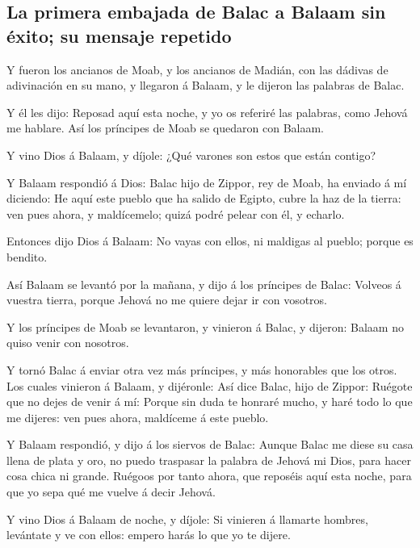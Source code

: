 \hypertarget{la-primera-embajada-de-balac-a-balaam-sin-uxe9xito-su-mensaje-repetido}{%
\subsection{La primera embajada de Balac a Balaam sin éxito; su mensaje
repetido}\label{la-primera-embajada-de-balac-a-balaam-sin-uxe9xito-su-mensaje-repetido}}

 Y fueron los ancianos de Moab, y los ancianos de Madián,
con las dádivas de adivinación en su mano, y llegaron á Balaam, y le
dijeron las palabras de Balac.

 Y él les dijo: Reposad aquí esta noche, y yo os referiré
las palabras, como Jehová me hablare. Así los príncipes de Moab se
quedaron con Balaam.

 Y vino Dios á Balaam, y díjole: ¿Qué varones son estos que
están contigo?

 Y Balaam respondió á Dios: Balac hijo de Zippor, rey de
Moab, ha enviado á mí diciendo:  He aquí este pueblo que ha
salido de Egipto, cubre la haz de la tierra: ven pues ahora, y
maldícemelo; quizá podré pelear con él, y echarlo.

 Entonces dijo Dios á Balaam: No vayas con ellos, ni
maldigas al pueblo; porque es bendito.

 Así Balaam se levantó por la mañana, y dijo á los
príncipes de Balac: Volveos á vuestra tierra, porque Jehová no me quiere
dejar ir con vosotros.

 Y los príncipes de Moab se levantaron, y vinieron á Balac,
y dijeron: Balaam no quiso venir con nosotros.

 Y tornó Balac á enviar otra vez más príncipes, y más
honorables que los otros.  Los cuales vinieron á Balaam, y
dijéronle: Así dice Balac, hijo de Zippor: Ruégote que no dejes de venir
á mí:  Porque sin duda te honraré mucho, y haré todo lo que
me dijeres: ven pues ahora, maldíceme á este pueblo.

 Y Balaam respondió, y dijo á los siervos de Balac: Aunque
Balac me diese su casa llena de plata y oro, no puedo traspasar la
palabra de Jehová mi Dios, para hacer cosa chica ni grande.
 Ruégoos por tanto ahora, que reposéis aquí esta noche,
para que yo sepa qué me vuelve á decir Jehová.

 Y vino Dios á Balaam de noche, y díjole: Si vinieren á
llamarte hombres, levántate y ve con ellos: empero harás lo que yo te
dijere.

